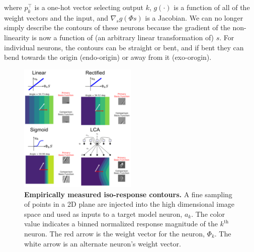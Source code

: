 where $p_{k}^\top$ is a one-hot vector selecting output $k$, $g(\cdot)$ is a function of all of the weight vectors and the input, and $\nabla_{s}g(\Phi s)$ is a Jacobian. We can no longer simply describe the contours of these neurons because the gradient of the non-linearity is now a function of (an arbitrary linear transformation of) $s$. For individual neurons, the contours can be straight or bent, and if bent they can bend towards the origin (endo-origin) or away from it (exo-orogin).

\begin{figure}
    \begin{center}
    \centerline{\includegraphics[width=0.5\textwidth]{figures/iso_contour_comparison.png}}
    \end{center}
    \caption{\textbf{Empirically measured iso-response contours.} A fine sampling of points in a 2D plane are injected into the high dimensional image space and used as inputs to a target model neuron, $a_{k}$. The color value indicates a binned normalized response magnitude of the $k^{\text{th}}$ neuron. The red arrow is the weight vector for the neuron, $\Phi_{k}$. The white arrow is an alternate neuron's weight vector.}
    \label{fig:ch4_iso_contours}
\end{figure}

